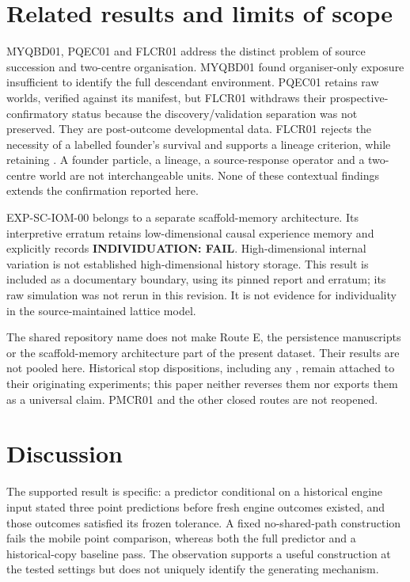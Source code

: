 \documentclass[11pt]{article}
\begin{document}
\section{Related results and limits of scope}
MYQBD01, PQEC01 and FLCR01 address the distinct problem of source succession and
two-centre organisation. MYQBD01 found organiser-only exposure insufficient to identify
the full descendant environment. PQEC01 retains \VPQArchives{} raw worlds, verified against
its manifest, but FLCR01 withdraws their prospective-confirmatory status because the
discovery/validation separation was not preserved. They are post-outcome developmental data.
FLCR01 rejects the necessity of a labelled founder's survival and supports a lineage
criterion, while retaining
.
A founder particle, a lineage, a source-response operator and a two-centre world are not
interchangeable units. None of these contextual findings extends the confirmation reported here.

EXP-SC-IOM-00 belongs to a separate scaffold-memory architecture. Its interpretive erratum
retains low-dimensional causal experience memory and explicitly records
\textbf{INDIVIDUATION: FAIL}. High-dimensional internal variation is not established
high-dimensional history storage. This result is included as a documentary boundary, using
its pinned report and erratum; its raw simulation was not rerun in this revision.
It is not evidence for individuality in the source-maintained lattice model.

The shared repository name does not make Route E, the persistence manuscripts or the
scaffold-memory architecture part of the present dataset. Their results are not pooled here.
Historical stop dispositions, including any
, remain attached to their originating experiments;
this paper neither reverses them nor exports them as a universal claim.
PMCR01 and the other closed routes are not reopened.

\section{Discussion}
The supported result is specific: a predictor conditional on a historical engine input
stated three point predictions before fresh engine outcomes existed, and
those outcomes satisfied its frozen tolerance. A fixed no-shared-path construction fails
the mobile point comparison, whereas both the full predictor and a historical-copy baseline
pass. The observation supports a useful construction at the tested settings but does not
uniquely identify the generating mechanism.
\end{document}
